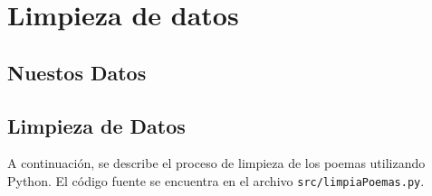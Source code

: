 \section{Limpieza de datos}

\subsection{Nuestos Datos}


\subsection{Limpieza de Datos}

A continuación, se describe el proceso de limpieza de los poemas utilizando Python. El código fuente se encuentra en el archivo \texttt{src/limpiaPoemas.py}.

